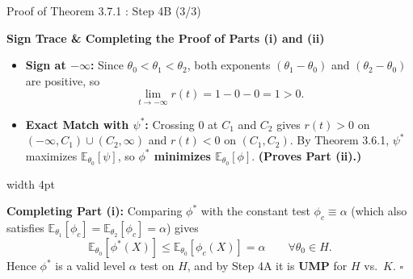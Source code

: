 \documentclass[10pt, aspectratio=169, xcolor=dvipsnames]{beamer}
\newcommand{\lead}[1]{{\color{UniBlue}\bfseries #1}}
\begin{document}
\begin{frame}{Proof of Theorem 3.7.1 : Step 4B (3/3)}
    
    \lead{Sign Trace \& Completing the Proof of Parts (i) and (ii)}\\
    \vspace{0.2cm}
    
    \color{Slate}
    \begin{itemize}
        \setlength\itemsep{6pt}
        \item[\textcolor{Teal}{\textbullet}] \textbf{Sign at $-\infty$:} Since $\theta_0 < \theta_1 < \theta_2$, both exponents $(\theta_1 - \theta_0)$ and $(\theta_2 - \theta_0)$ are positive, so
        \[
            \lim_{t \to -\infty} r(t) = 1 - 0 - 0 = 1 > 0.
        \]
        
        \item[\textcolor{Teal}{\textbullet}] \textbf{Exact Match with $\psi^*$:} Crossing $0$ at $C_1$ and $C_2$ gives $r(t) > 0$ on $(-\infty, C_1) \cup (C_2, \infty)$ and $r(t) < 0$ on $(C_1, C_2)$. By Theorem 3.6.1, $\psi^*$ maximizes $\mathbb{E}_{\theta_0}[\psi]$, so \textbf{$\phi^*$ minimizes $\mathbb{E}_{\theta_0}[\phi]$}. \textbf{(Proves Part (ii).)}
    \end{itemize}
    
    \vspace{0.15cm}
    \noindent
    {\color{Teal}\vrule width 4pt}%
    \hspace{10pt}%
    \begin{minipage}{\dimexpr\textwidth-14pt\relax}
        \textbf{Completing Part (i):} Comparing $\phi^*$ with the constant test $\phi_c \equiv \alpha$ (which also satisfies $\mathbb{E}_{\theta_1}[\phi_c] = \mathbb{E}_{\theta_2}[\phi_c] = \alpha$) gives
        \[
            \mathbb{E}_{\theta_0}[\phi^*(X)] \le \mathbb{E}_{\theta_0}[\phi_c(X)] = \alpha \qquad \forall \theta_0 \in H.
        \]
        Hence $\phi^*$ is a valid level $\alpha$ test on $H$, and by Step 4A it is \textbf{UMP} for $H$ vs.\ $K$. \hfill $\square$
    \end{minipage}
\end{frame}
\end{document}
